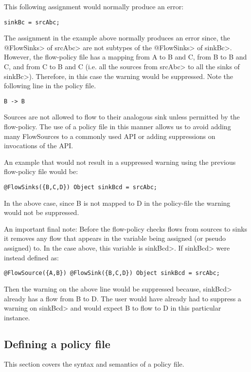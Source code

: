 This following assignment would normally produce an error:
\begin{Verbatim}
sinkBc = srcAbc;
\end{Verbatim}

The assignment in the example above normally produces an error
since, the \<@FlowSinks> of \<srcAbc> are not subtypes of the
\<@FlowSinks> of \<sinkBc>.  However, the flow-policy file has a
mapping from A to B and C, from B to B and C, and from C to B
and C (i.e. all the sources from \<srcAbc> to all the sinks of
\<sinkBc>).   Therefore, in this case the warning would be
suppressed.  Note the following line in the policy file.
\begin{Verbatim}
B -> B
\end{Verbatim}

Sources are not allowed to flow to their analogous sink unless
permitted by the flow-policy.  The use of a policy file in
this manner allows us to avoid adding many FlowSources to a
commonly used API or adding suppressions on invocations of
the API.

An example that would not result in a suppressed warning
using the previous flow-policy file would be:

\begin{Verbatim}
@FlowSinks({B,C,D}) Object sinkBcd = srcAbc;
\end{Verbatim}

In the above case, since B is not mapped to D in the
policy-file the warning would not be suppressed.

An important final note:
Before the flow-policy checks flows from sources to sinks
it removes any flow that appears in the variable being assigned
(or pseudo assigned) to.  In the case above, this variable is
\<sinkBcd>.  If \<sinkBcd> were instead defined as:
\begin{Verbatim}
@FlowSource({A,B}) @FlowSink({B,C,D}) Object sinkBcd = srcAbc;
\end{Verbatim}
Then the warning on the above line would be suppressed because,
\<sinkBcd> already has a flow from B to D.  The user would have
already had to suppress a warning on \<sinkBcd> and would expect
B to flow to D in this particular instance.

\subsection{Defining a policy file}
This section covers the syntax and semantics of a policy file.

